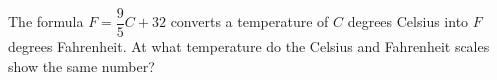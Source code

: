 The formula $F=\dfrac{9}{5}C+32$ converts a temperature of $C$ degrees Celsius into $F$ degrees Fahrenheit. At what temperature do the Celsius and Fahrenheit scales show the same number?
